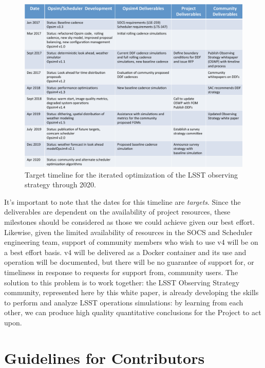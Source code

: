 \begin{figure}[t!]
\includegraphics[angle=0,width=0.9\linewidth,clip]{figs/opsim_timeline.pdf}
\caption{Target timeline for the iterated optimization of the LSST observing strategy through 2020.}
\label{fig:timeline}
\end{figure}

It's important to note that the dates for this timeline are {\it
targets}. Since the deliverables are dependent on the availability of
project resources, these milestones should be considered as those we
could achieve given our best effort. Likewise, given the limited
availability of resources in the SOCS and Scheduler engineering team,
support of community members who wish to use \OpSim v4 will be on a best
effort basis. \OpSim v4 will be delivered as a Docker container and its
use and operation will be documented, but there will be no guarantee of
support for, or timeliness in response to requests for support from,
community users. The solution to this problem is to work together: the LSST Observing Strategy community, represented here by this white paper, is already developing the skills to perform and analyze LSST operations simulations: by learning from each other, we can produce high quality quantitative conclusions for the Project to act upon.



\navigationbar



\section{Guidelines for Contributors}
\def\secname{guidelines}\label{sec:\secname}

